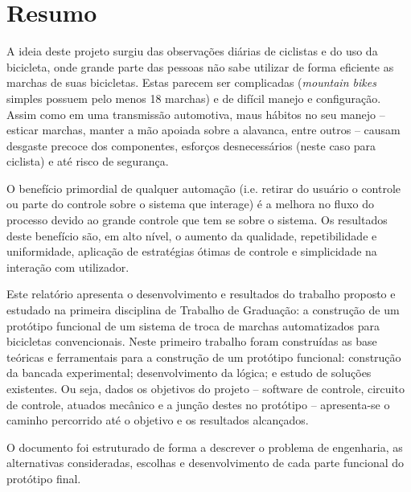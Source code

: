 \documentclass[a4paper,11pt]{article}
\begin{document}



%
\section{Resumo}
\label{sec:resumo}
A ideia deste projeto surgiu das observações diárias de ciclistas e do
uso da bicicleta, onde grande parte das pessoas não sabe utilizar de
forma eficiente as marchas de suas bicicletas. Estas parecem ser
complicadas (\textit{mountain bikes} simples possuem pelo menos 18 marchas) e de
difícil manejo e configuração. Assim como em uma transmissão automotiva, maus
hábitos no seu manejo -- esticar marchas, manter a mão apoiada sobre a alavanca,
entre outros -- causam desgaste precoce dos componentes, esforços desnecessários
(neste caso para ciclista) e até risco de segurança.

O benefício primordial de qualquer automação (i.e. retirar do usuário o
controle ou parte do controle sobre o sistema que interage) é a melhora no
fluxo do processo devido ao grande controle que tem se sobre o sistema. Os
resultados deste benefício são, em alto nível, o aumento da qualidade,
repetibilidade e uniformidade, aplicação de estratégias ótimas de controle e
simplicidade na interação com utilizador.

Este relatório apresenta o desenvolvimento e resultados do trabalho proposto e
estudado na primeira disciplina de Trabalho de Graduação: a construção de um
protótipo funcional de um sistema de troca de marchas automatizados para
bicicletas convencionais. Neste primeiro trabalho foram construídas as base
teóricas e ferramentais para a construção de um protótipo funcional: construção
da bancada experimental; desenvolvimento da lógica; e estudo de soluções 
existentes. Ou seja, dados os objetivos do projeto -- software de controle,
circuito de controle, atuados mecânico e a junção destes no protótipo --
apresenta-se o caminho percorrido até o objetivo e os resultados alcançados.

O documento foi estruturado de forma a descrever o problema de engenharia, as
alternativas consideradas, escolhas e desenvolvimento de cada parte funcional do
protótipo final.
\end{document}
